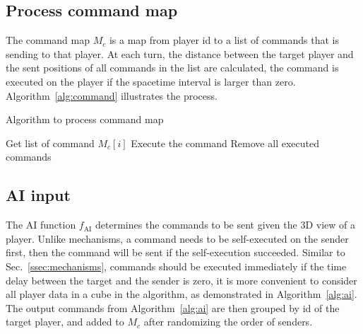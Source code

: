 \documentclass{article}
\newcommand{\Desc}[2]{\State \makebox[2em][l]{#1}#2}
\begin{document}
\subsection{Process command map} \label{ssec:command}

The command map $M_c$ is a map from player id to a list of commands that is sending to that player.
At each turn, the distance between the target player and the sent positions of all commands in the list are calculated,
the command is executed on the player if the spacetime interval is larger than zero.
Algorithm~\ref{alg:command} illustrates the process.

\begin{algorithm}
\caption{Algorithm to process command map}
\label{alg:command}
\begin{algorithmic}[1]
  \Input
    \Desc{$M_c$ the command map}
  \EndInput
    \State Get list of command $M_c[i]$
        \State Execute the command
      \EndIf
    \EndFor
  \EndFor
  \State Remove all executed commands
\end{algorithmic}
\end{algorithm}

\subsection{AI input} \label{ssec:ai}

The AI function $f_{\textrm{AI}}$ determines the commands to be sent given the 3D view of a player.
Unlike mechanisms, a command needs to be self-executed on the sender first,
then the command will be sent if the self-execution succeeded.
Similar to Sec.~\ref{ssec:mechanisms}, commands should be executed immediately if the
time delay between the target and the sender is zero, it is more convenient to
consider all player data in a cube in the algorithm, 
as demonstrated in Algorithm~\ref{alg:ai}.
The output commands from Algorithm~\ref{alg:ai} are then grouped by id of the target
player, and added to $M_c$ after randomizing the order of senders.
\end{document}
